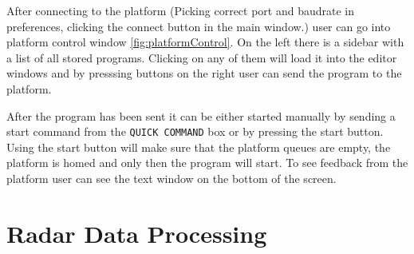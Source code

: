 After connecting to the platform (Picking correct port and baudrate in preferences, clicking the connect button in the main window.) user can go into platform control window \ref{fig:platformControl}.
On the left there is a sidebar with a list of all stored programs.
Clicking on any of them will load it into the editor windows and by presssing buttons on the right user can send the program to the platform.

After the program has been sent it can be either started manually by sending a start command from the \verb|QUICK COMMAND| box or by pressing the start button.
Using the start button will make sure that the platform queues are empty, the platform is homed and only then the program will start.
To see feedback from the platform user can see the text window on the bottom of the screen.




\chapter{Radar Data Processing}






\listoffigures

\listoftables

\clearpage
\openright


